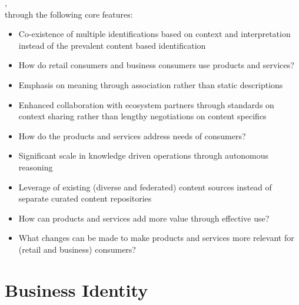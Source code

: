 ,\\
through the following core features:

\begin{description}[font=\bfseries,nosep,leftmargin=!,labelwidth=\widthof{\bfseries UNDERSTAND}]
    \item[SENSE]
        \begin{itemize}[leftmargin=1em]
            \item Co-existence of multiple identifications based on context and interpretation instead of
                  the prevalent content based identification
            \item How do retail consumers and business consumers use products and services?
        \end{itemize}
    \item[UNDERSTAND]
        \begin{itemize}[leftmargin=1em]
            \item Emphasis on meaning through association rather than static descriptions
            \item Enhanced collaboration with ecosystem partners through standards on context sharing
                  rather than lengthy negotiations on content specifics
            \item How do the products and services address needs of consumers?
        \end{itemize}
    \item[DECIDE]
        \begin{itemize}[leftmargin=1em]
            \item Significant scale in knowledge driven operations through autonomous reasoning
            \item Leverage of existing (diverse and federated) content sources instead of
                  separate curated content repositories
            \item How can products and services add more value through effective use?
            \item What changes can be made to make products and services more relevant
                  for (retail and business) consumers?
        \end{itemize}
\end{description}

\section*{Business Identity}
\label{sec:ekg-mm-business-identity}

